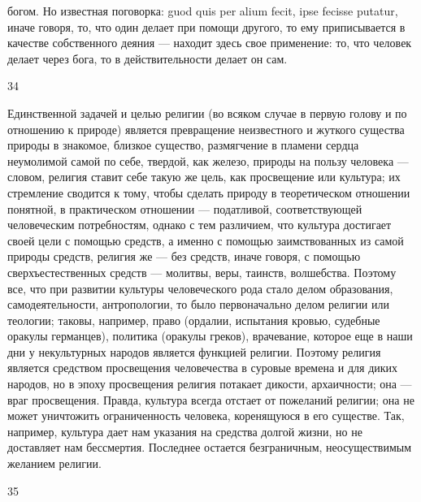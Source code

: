 \documentclass[12pt]{article}
\begin{document}
богом. Но известная поговорка: guod quis per alium fecit, ipse fecisse putatur, иначе говоря, то, что один делает при помощи другого, то ему приписывается в качестве собственного деяния --- находит здесь свое применение: то, что человек делает через бога, то в действительности делает он сам.



34

Единственной задачей и целью религии (во всяком случае в первую голову и по отношению к природе) является превращение неизвестного и жуткого существа природы в знакомое, близкое существо, размягчение в пламени сердца неумолимой самой по себе, твердой, как железо, природы на пользу человека --- словом, религия ставит себе такую же цель, как просвещение или культура; их стремление сводится к тому, чтобы сделать природу в теоретическом отношении понятной, в практическом отношении --- податливой, соответствующей человеческим потребностям, однако с тем различием, что культура достигает своей цели с помощью средств, а именно с помощью заимствованных из самой природы средств, религия же --- без средств, иначе говоря, с помощью сверхъестественных средств --- молитвы, веры, таинств, волшебства. Поэтому все, что при развитии культуры человеческого рода стало делом образования, самодеятельности, антропологии, то было первоначально делом религии или теологии; таковы, например, право (ордалии, испытания кровью, судебные оракулы германцев), политика (оракулы греков), врачевание, которое еще в наши дни у некультурных народов является функцией религии. Поэтому религия является средством просвещения человечества в суровые времена и для диких народов, но в эпоху просвещения религия потакает дикости, архаичности; она --- враг просвещения. Правда, культура всегда отстает от пожеланий религии; она не может уничтожить ограниченность человека, коренящуюся в его существе. Так, например, культура дает нам указания на средства долгой жизни, но не доставляет нам бессмертия. Последнее остается безграничным, неосуществимым желанием религии.



35
\end{document}
